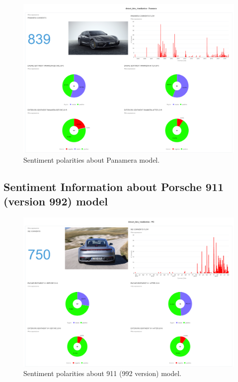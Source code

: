 \begin{figure}[ht]
	\centering
	\includegraphics[width=\textwidth]{figures/odv_export/dataset_data_visualization_2.pdf}
	\caption{Sentiment polarities about Panamera model.}
	\label{fig:panamera-snt}
\end{figure}




\subsection{Sentiment Information about Porsche 911 (version 992) model}

\begin{figure}[H]
	\centering
	\includegraphics[width=\textwidth]{figures/odv_export/dataset_data_visualization_4.pdf}
	\caption{Sentiment polarities about 911 (992 version) model.}
	\label{fig:992-snt}
\end{figure}


